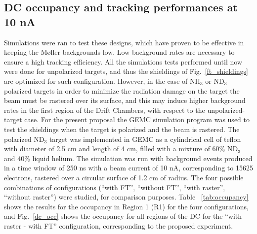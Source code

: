 \subsection{DC occupancy and tracking performances at 10 nA}
Simulations were ran to test these designs, which have proven to be effective in keeping the M\o ller backgrounds low. Low background rates are necessary to ensure a high tracking efficiency. All the simulations tests performed until now were done for unpolarized targets, and thus the shieldings of Fig.~\ref{ft_shieldings} are optimized for such configuration. 
However, in the case of NH$_3$ or ND$_3$ polarized targets in order to minimize the radiation damage on the target the beam must be rastered over its surface, and this may induce higher background rates in the first region of the Drift Chambers, with respect to the unpolarized-target case. 
For the present proposal the GEMC simulation program was used to test the shieldings when the target is polarized and the beam is rastered. The polarized ND$_3$ target was implemented in GEMC as a cylindrical cell of teflon with diameter of 2.5 cm and length of 4 cm, filled with a mixture of 60\% ND$_3$ and 40\% liquid helium. The simulation was run with background events produced in a time window of 250 ns with a beam current of 10 nA, corresponding to 15625 electrons, rastered over a circular surface of 1.2 cm of radius. The four possible combinations of configurations (``with FT'', ``without FT'', ``with raster'', ``without raster'') were studied, for comparison purposes. Table ~\ref{tab:occupancy} shows the results for the occupancy in Region 1 (R1) for the four configurations, and Fig.~\ref{dc_occ} shows the occupancy for all regions of the DC for the ``with raster - with FT'' configuration, corresponding to the proposed experiment. 

